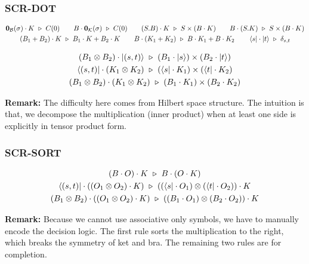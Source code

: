 \documentclass[manuscript, review, timestamp]{acmart}
\newcommand*{\reduce}{\ \triangleright\ }
\begin{document}
\subsubsection*{\textsf{SCR-DOT}}
\begin{gather*}
  \mathbf{0}_\mathcal{B}(\sigma) \cdot K \reduce C(0)
  \qquad
  B \cdot \mathbf{0}_\mathcal{K}(\sigma) \reduce C(0)
  \qquad
  (S.B) \cdot K \reduce S \times (B \cdot K)
  \qquad
  B \cdot (S.K) \reduce S \times (B \cdot K) \\
  (B_1 + B_2) \cdot K \reduce B_1 \cdot K + B_2 \cdot K
  \qquad
  B \cdot (K_1 + K_2) \reduce B \cdot K_1 + B \cdot K_2
  \qquad
  \bra{s} \cdot \ket{t} \reduce \delta_{s, t} \\
\end{gather*}

\begin{gather*}
  (B_1 \otimes B_2) \cdot \ket{(s, t)} \reduce (B_1 \cdot \ket{s}) \times (B_2 \cdot \ket{t}) \\
  \bra{(s, t)} \cdot (K_1 \otimes K_2) \reduce (\bra{s} \cdot K_1) \times (\bra{t} \cdot K_2) \\
  (B_1 \otimes B_2) \cdot (K_1 \otimes K_2) \reduce (B_1 \cdot K_1) \times (B_2 \cdot K_2)
\end{gather*}

\textbf{Remark:} The difficulty here comes from Hilbert space structure. The intuition is that, we decompose the multiplication (inner product) when at least one side is explicitly in tensor product form.

\subsubsection*{\textsf{SCR-SORT}}
\begin{gather*}
  (B \cdot O) \cdot K \reduce B \cdot (O \cdot K) \\
  \bra{(s, t)} \cdot ((O_1 \otimes O_2) \cdot K) \reduce ((\bra{s} \cdot O_1) \otimes (\bra{t} \cdot O_2)) \cdot K \\
  (B_1 \otimes B_2) \cdot ((O_1 \otimes O_2) \cdot K) \reduce ((B_1 \cdot O_1) \otimes (B_2 \cdot O_2)) \cdot K \\
\end{gather*}


\textbf{Remark:} Because we cannot use associative only symbols, we have to manually encode the decision logic. The first rule sorts the multiplication to the right, which breaks the symmetry of ket and bra. The remaining two rules are for completion.
\end{document}

